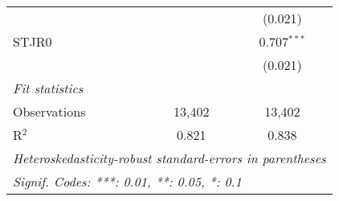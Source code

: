 \begin{tabular}{lcc}
                           &               & (0.021)\\   
   STJR0                   &               & 0.707$^{***}$\\   
                           &               & (0.021)\\   
   \midrule
   \emph{Fit statistics}\\
   Observations            & 13,402        & 13,402\\  
   R$^2$                   & 0.821         & 0.838\\  
   \midrule \midrule
   \multicolumn{3}{l}{\emph{Heteroskedasticity-robust standard-errors in parentheses}}\\
   \multicolumn{3}{l}{\emph{Signif. Codes: ***: 0.01, **: 0.05, *: 0.1}}\\
\end{tabular}
\par\endgroup


